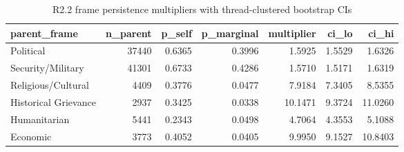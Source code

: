 \begin{table}
\caption{R2.2 frame persistence multipliers with thread-clustered bootstrap CIs}
\label{tab:r1r2_persistence_multipliers}
\begin{tabular}{lrrrrrr}
\toprule
parent\_frame & n\_parent & p\_self & p\_marginal & multiplier & ci\_lo & ci\_hi \\
\midrule
Political & 37440 & 0.6365 & 0.3996 & 1.5925 & 1.5529 & 1.6326 \\
Security/Military & 41301 & 0.6733 & 0.4286 & 1.5710 & 1.5171 & 1.6319 \\
Religious/Cultural & 4409 & 0.3776 & 0.0477 & 7.9184 & 7.3405 & 8.5355 \\
Historical Grievance & 2937 & 0.3425 & 0.0338 & 10.1471 & 9.3724 & 11.0260 \\
Humanitarian & 5441 & 0.2343 & 0.0498 & 4.7064 & 4.3553 & 5.1088 \\
Economic & 3773 & 0.4052 & 0.0405 & 9.9950 & 9.1527 & 10.8403 \\
\bottomrule
\end{tabular}
\end{table}
